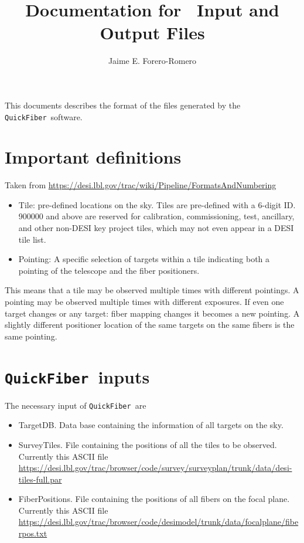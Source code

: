 \documentclass{article}
\title{Documentation for \code\ Input and Output Files}
\author{Jaime E. Forero-Romero}
\newcommand{\code}{{\texttt{QuickFiber}}}
\begin{document}
\maketitle
\tableofcontents 

\vspace{1cm}
This documents describes the format of the files generated by the
\code\ software.  

\section{Important definitions}
Taken from \url{https://desi.lbl.gov/trac/wiki/Pipeline/FormatsAndNumbering}
\begin{itemize}

  \item Tile: pre-defined locations on the sky. Tiles are pre-defined
    with a 6-digit ID. 900000 and above are reserved for calibration,
    commissioning, test, ancillary, and other non-DESI key project
    tiles, which may not even appear in a DESI tile list.  
  \item Pointing: A specific
    selection of targets within a tile indicating both a pointing of the
    telescope and the fiber positioners.  
\end{itemize}

This means that a tile may be observed
multiple times with different pointings. A pointing may be observed
multiple times with different exposures. If even one target changes
or any target: fiber mapping changes it becomes a new pointing. A
slightly different positioner location of the same targets on the
same fibers is the same pointing.  

\section{\code\ inputs}
The necessary input of \code\ are 
\begin{itemize}
\item TargetDB. Data base containing the information of all targets on the sky. 
\item SurveyTiles. File containing the positions of all the tiles to
  be observed. Currently this ASCII file
  \url{https://desi.lbl.gov/trac/browser/code/survey/surveyplan/trunk/data/desi-tiles-full.par} 
\item FiberPositions. File containing the positions of all fibers on
  the focal plane.  Currently this ASCII file \url{https://desi.lbl.gov/trac/browser/code/desimodel/trunk/data/focalplane/fiberpos.txt}
\end{itemize}
\end{document}
